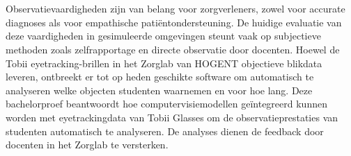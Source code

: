 
%
%
%
%
%

%



\chapter*{}

Observatievaardigheden zijn van belang voor zorgverleners, zowel voor accurate diagnoses als voor empathische patiëntondersteuning. 
De huidige evaluatie van deze vaardigheden in gesimuleerde omgevingen steunt vaak op subjectieve 
methoden zoals zelfrapportage en directe observatie door docenten. 
Hoewel de Tobii eyetracking-brillen in het Zorglab van HOGENT objectieve blikdata leveren, 
ontbreekt er tot op heden geschikte software om automatisch te analyseren welke objecten studenten waarnemen en voor hoe lang. 
Deze bachelorproef beantwoordt hoe computervisiemodellen geïntegreerd kunnen worden met 
eyetrackingdata van Tobii Glasses om de observatieprestaties van studenten automatisch te analyseren.
De analyses dienen de feedback door docenten in het Zorglab te versterken.

